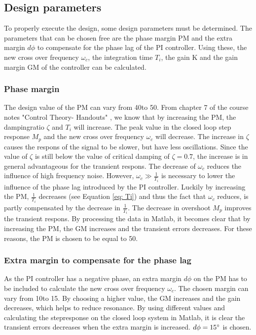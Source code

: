 \documentclass[a4paper,kul]{kulakarticle} %
\begin{document}
\subsection{Design parameters}
To properly execute the design, some design parameters must be determined. The parameters that can be chosen free are the phase margin PM and the extra margin $d\phi$ to compensate for the phase lag of the PI controller. Using these, the new cross over frequency $\omega_c$, the integration time $T_i$, the gain K and the gain margin GM of the controller can be calculated. 



\subsubsection{Phase margin}
The design value of the PM can vary from 40\degree to 50\degree. From chapter 7 of the course notes "Control Theory- Handouts" \cite{slidescontroltheory}, we know that by increasing the PM, the dampingratio $\zeta$ and $T_i$ will increase. The peak value in the closed loop step response $M_p$ and the new cross over frequency $\omega_c$ will decrease. The increase in $\zeta$ causes the respons of the signal to be slower, but have less oscillations. Since the value of $\zeta$ is still below the value of critical damping of $\zeta = 0.7$, the increase is in general advantageous for the transient respons. The decrease of $\omega_c$ %
 reduces the influence of high frequency noise. However, $\omega_c \gg \frac{1}{T_i}$ is necessary to lower the influence of the phase lag introduced by the PI controller. Luckily by increasing the PM, $\frac{1}{T_i}$ decreases (see Equation \ref{eq: Ti}) and thus the fact that $\omega_c$ reduces, is partly compensated by the decrease in $\frac{1}{T_i}$. The decrease in overshoot $M_p$ improves the transient respons. By processing the data in Matlab, it becomes clear that by increasing the PM, the GM increases and the transient errors decreases. For these reasons, the PM is chosen to be equal to 50\degree. 

\subsubsection{Extra margin to compensate for the phase lag}
	As the PI controller has a negative phase, an extra margin $d\phi$ on the PM has to be included to calculate the new cross over frequency $\omega_c$. The chosen margin can vary from 10\degree to 15\degree. By choosing a higher value, the GM increases and the gain decreases, which helps to reduce resonance. By using different values and calculating the stepresponse on the closed loop system in Matlab, it is clear the transient errors decreases when the extra margin is increased. $d\phi = 15\degree$ is chosen. 
\end{document}
